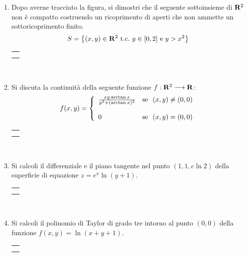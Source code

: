 \documentclass[12pt,a4paper]{report}\pagenumbering{roman}
\begin{document}
\begin{enumerate}
\item Dopo averne tracciato la figura, si dimostri che il seguente sottoinsieme
di ${\bf R}^2$ non \`e compatto costruendo un ricoprimento di aperti che non
ammette un sottoricoprimento finito.
$$S=\left\{(x,y)\in{\bf R}^2\ \mbox{t.c.}\ y\in[0,2]\ \mbox{e}\ y>x^2\right\}$$
\hspace*{-3.5cm}\begin{tabular}{c}\hline\\\hspace*{16cm}\end{tabular}\\
\hspace*{-3.5cm}{\bf SVOLGIMENTO:}\pagebreak 

\item Si discuta la continuit\`a della seguente funzione $f:{\bf R}^2\longrightarrow
{\bf R}$:
$$f(x,y)=\left\{\begin{array}{ll} {xy\arctan{x}\over y^2+(\arctan{x})^2} & 
\mbox{se}\ \ (x,y)\neq (0,0)\\ \\0&\mbox{se}\ \ (x,y)=(0,0)\end{array}\right.$$
\hspace*{-3.5cm}\begin{tabular}{c}\hline\\\hspace*{16cm}\end{tabular}\\
\hspace*{-3.5cm}{\bf SVOLGIMENTO:}\pagebreak

\item Si calcoli il differenziale e il piano tangente nel punto $(1,1,e\ln2)$
della superficie di equazione $z=e^x\ln(y+1)$.\\
\hspace*{-3.5cm}\begin{tabular}{c}\hline\\\hspace*{16cm}\end{tabular}\\
\hspace*{-3.5cm}{\bf SVOLGIMENTO:}\pagebreak

\item Si calcoli il polinomio di Taylor di grado tre intorno al punto $(0,0)$
della funzione $f(x,y)=\ln(x+y+1).$ \\
\hspace*{-3.5cm}\begin{tabular}{c}\hline\\\hspace*{16cm}\end{tabular}\\
\hspace*{-3.5cm}{\bf SVOLGIMENTO:}\pagebreak


\end{enumerate}
\end{document}
